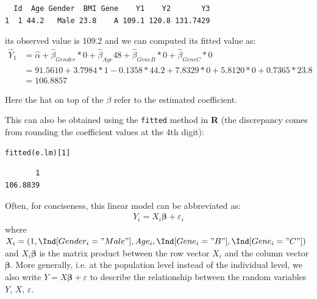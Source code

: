 \documentclass[12pt]{article}
\newcommand\Rlogo{\textbf{\textsf{R}}\xspace} %
\begin{document}
\begin{verbatim}
  Id  Age Gender  BMI Gene    Y1    Y2       Y3
1  1 44.2   Male 23.8    A 109.1 120.8 131.7429
\end{verbatim}
its observed value is 109.2 and we can computed its fitted value as:
\begin{align*}
\hat{Y}_1 &= \widehat{\alpha} + \widehat{\beta}_{Gender} * 0 + \widehat{\beta}_{Age} 48 + \widehat{\beta}_{GeneB} * 0 + \widehat{\beta}_{GeneC} * 0 \\
          &= 91.5610 + 3.7984 * 1 - 0.1358 * 44.2 + 7.8329 * 0 + 5.8120 * 0 + 0.7365 * 23.8 \\
          & = 106.8857
\end{align*}

Here the hat on top of the \(\beta\) refer to the estimated coefficient.

\clearpage 

This can also be obtained using the \texttt{fitted} method in \Rlogo{} (the
discrepancy comes from rounding the coefficient values at the 4th
digit):
\lstset{language=r,label= ,caption= ,captionpos=b,numbers=none}
\begin{lstlisting}
fitted(e.lm)[1]
\end{lstlisting}

\begin{verbatim}
       1 
106.8839
\end{verbatim}

Often, for conciseness, this linear model can be abbreviated as:
\begin{align*}
Y_i = X_i \boldsymbol{\beta} + \varepsilon_i
\end{align*}
where \(X_i = \left(1, \Ind[Gender_i="Male"], Age_i,
\Ind[Gene_i="B"], \Ind[Gene_i="C"]\right)\) and \(X_i
\boldsymbol{\beta}\) is the matrix product between the row vector
\(X_i\) and the column vector \(\boldsymbol{\beta}\). More generally,
i.e. at the population level instead of the individual level, we also
write \(Y = X \boldsymbol{\beta} + \varepsilon\) to describe the
relationship between the random variables \(Y\), \(X\),
\(\varepsilon\).
\end{document}
